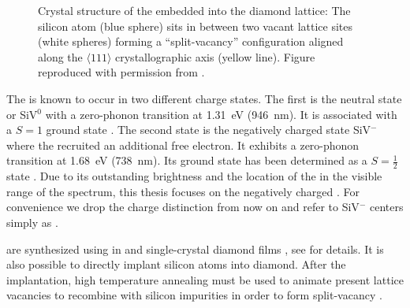   \begin{figure}[!htb]
		\centering
		\caption[Split-vacancy configuration for \sivs in diamond]{Crystal structure of the \siv embedded into the diamond lattice: The silicon atom (blue sphere) sits in between two vacant lattice sites (white spheres) forming a ``split-vacancy'' configuration aligned along the $\langle 111 \rangle$ crystallographic axis (yellow line). Figure reproduced with permission from \cite{Riedrich-moller2014}.}
		\label{fig::siv_lattice}
	\end{figure}


  The \siv is known to occur in two different charge states. The first is the neutral state or SiV$^0$ with a zero-phonon transition at \SI{1.31}{\eV} (\SI{946}{\nm}). It is associated with a $S = 1$ ground state \cite{DHaenens-Johansson2011}. The second state is the negatively charged state SiV$^{-}$ where the \sivc recruited an additional free electron. It exhibits a zero-phonon transition at \SI{1.68}{\eV} (\SI{738}{\nm}). Its ground state has been determined as a $S = \frac{1}{2}$ state \cite{Goss2007, Hepp2014}. Due to its outstanding brightness and the location of the \zpl in the visible range of the spectrum, this thesis focuses on the negatively charged \siv. For convenience we drop the charge distinction from now on and refer to SiV$^{-}$ centers simply as \sivs.

  \sivs are synthesized using \CVD in \nds and single-crystal diamond films \cite{Neu2011b}, see  for details. It is also possible to directly implant silicon atoms into diamond. After the implantation, high temperature annealing must be used to animate present lattice vacancies to recombine with silicon impurities in order to form split-vacancy \sivs \cite{Collins1983,Hepp2014}.

